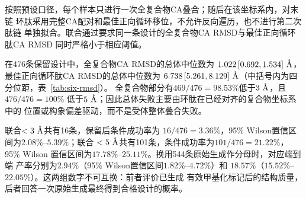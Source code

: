 按照预设口径，每个样本只进行一次全复合物CA叠合；随后在该坐标系内，对末链
环肽采用完整CA配对和最佳正向循环移位，不允许反向遍历，也不进行第二次肽链
单独拟合。联合通过要求同一条设计的全复合物CA RMSD与最佳正向循环肽CA RMSD
同时严格小于相应阈值。

在476条保留设计中，全复合物CA RMSD的总体中位数为
$1.022\,[0.692,1.534]~\text{\AA}$，最佳正向循环肽CA RMSD的总体中位数为
$6.738\,[5.261,8.129]~\text{\AA}$（中括号内为四分位距，表~\ref{tab:six-rmsd}）。
全复合物部分有$469/476=98.53\%$低于$3~\text{\AA}$，且$476/476=100\%$
低于$5~\text{\AA}$；因此总体失败主要由环肽在已经对齐的复合物坐标系中的
位置或构象偏差驱动，而不是受体整体叠合失败。

联合$<3~\text{\AA}$共有16条，保留后条件成功率为
$16/476=3.36\%$，95\% Wilson置信区间为$2.08\%$--$5.39\%$；联合
$<5~\text{\AA}$共有101条，条件成功率为$101/476=21.22\%$，95\% Wilson
置信区间为$17.78\%$--$25.11\%$。换用544条原始生成作分母时，对应端到端
产率分别为$2.94\%$（95\% Wilson置信区间$1.82\%$--$4.72\%$）和
$18.57\%$（$15.52\%$--$22.05\%$）。这两组数字不可互换：前者评价已生成
有效甲基化标记后的结构质量，后者回答一次原始生成最终得到合格设计的概率。

